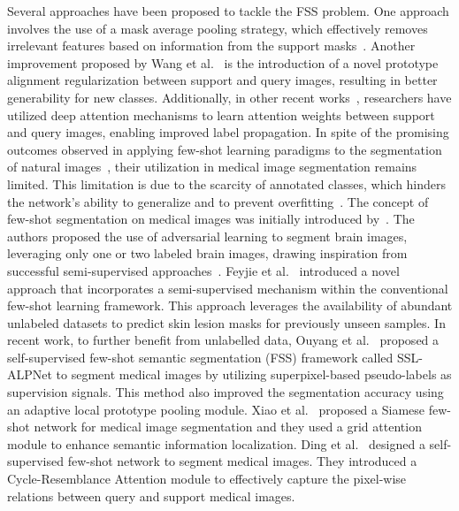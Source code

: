 \documentclass[runningheads]{llncs}
\begin{document}
Several approaches have been proposed to tackle the FSS problem. One approach involves the use of a mask average pooling strategy, which effectively removes irrelevant features based on information from the support masks~\cite{zhang2020sg}. Another improvement proposed by Wang et al.~\cite{wang2019panet} is the introduction of a novel prototype alignment regularization between support and query images, resulting in better generability for new classes. Additionally, in other recent works~\cite{zhang2019canet}, researchers have utilized deep attention mechanisms to learn attention weights between support and query images, enabling improved label propagation. 
In spite of the promising outcomes observed in applying few-shot learning paradigms to the segmentation of natural images~\cite{zhou2023mceenet}, their utilization in medical image segmentation remains limited. This limitation is due to the scarcity of annotated classes, which hinders the network's ability to generalize and to prevent overfitting~\cite{xiao2023siamese}. The concept of few-shot segmentation on medical images was initially introduced by~\cite{mondal2018few}. The authors proposed the use of adversarial learning to segment brain images, leveraging only one or two labeled brain images, drawing inspiration from successful semi-supervised approaches~\cite{souly2017semi}. 
Feyjie et al.~\cite{feyjie2020semi} introduced a novel approach that incorporates a semi-supervised mechanism within the conventional few-shot learning framework. This approach leverages the availability of abundant unlabeled datasets to predict skin lesion masks for previously unseen samples. In recent work, to further benefit from unlabelled data, Ouyang et al.~\cite {ouyang2022self} proposed a self-supervised few-shot semantic segmentation (FSS) framework called SSL-ALPNet to segment medical images by utilizing superpixel-based pseudo-labels as supervision signals. This method also improved the segmentation accuracy using an adaptive local prototype pooling module.
Xiao et al.~\cite{xiao2023siamese} proposed a Siamese few-shot network for medical image segmentation and they used a grid attention module to enhance semantic information localization.
Ding et al.~\cite{ding2023few} designed a self-supervised few-shot network to segment medical images. They introduced a Cycle-Resemblance Attention module to effectively capture the pixel-wise relations between query and support medical images.
\end{document}
